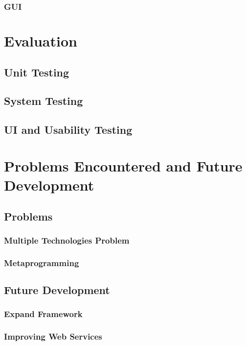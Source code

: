 \documentclass{l4proj}
\begin{document}
\subsection{GUI}

\chapter{Evaluation}

\section{Unit Testing}

\section{System Testing}

\section{UI and Usability Testing}

\chapter{Problems Encountered and Future Development}

\section{Problems}
\subsection{Multiple Technologies Problem}
\subsection{Metaprogramming}

\section{Future Development}
\subsection{Expand Framework}
\subsection{Improving Web Services}
\end{document}
